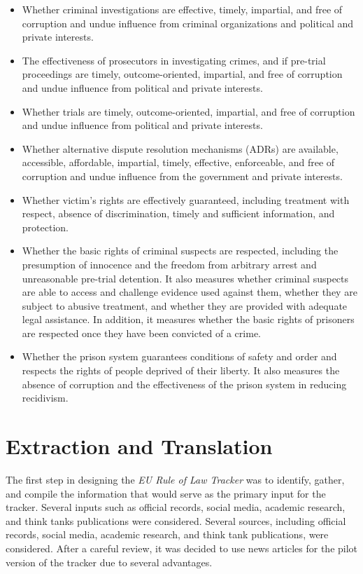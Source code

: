 \documentclass[
]{agujournal2019}
\providecommand{\tightlist}{%
  \setlength{\itemsep}{0pt}\setlength{\parskip}{0pt}}\usepackage{longtable,booktabs,array}
\begin{document}
\begin{itemize}
\tightlist
\item
  Whether criminal investigations are effective, timely, impartial, and
  free of corruption and undue influence from criminal organizations and
  political and private interests.
\item
  The effectiveness of prosecutors in investigating crimes, and if
  pre-trial proceedings are timely, outcome-oriented, impartial, and
  free of corruption and undue influence from political and private
  interests.
\item
  Whether trials are timely, outcome-oriented, impartial, and free of
  corruption and undue influence from political and private interests.
\item
  Whether alternative dispute resolution mechanisms (ADRs) are
  available, accessible, affordable, impartial, timely, effective,
  enforceable, and free of corruption and undue influence from the
  government and private interests.
\item
  Whether victim's rights are effectively guaranteed, including
  treatment with respect, absence of discrimination, timely and
  sufficient information, and protection.
\item
  Whether the basic rights of criminal suspects are respected, including
  the presumption of innocence and the freedom from arbitrary arrest and
  unreasonable pre-trial detention. It also measures whether criminal
  suspects are able to access and challenge evidence used against them,
  whether they are subject to abusive treatment, and whether they are
  provided with adequate legal assistance. In addition, it measures
  whether the basic rights of prisoners are respected once they have
  been convicted of a crime.
\item
  Whether the prison system guarantees conditions of safety and order
  and respects the rights of people deprived of their liberty. It also
  measures the absence of corruption and the effectiveness of the prison
  system in reducing recidivism.
\end{itemize}

\section{Extraction and Translation}\label{extraction-and-translation}

The first step in designing the \emph{EU Rule of Law Tracker} was to
identify, gather, and compile the information that would serve as the
primary input for the tracker. Several inputs such as official records,
social media, academic research, and think tanks publications were
considered. Several sources, including official records, social media,
academic research, and think tank publications, were considered. After a
careful review, it was decided to use news articles for the pilot
version of the tracker due to several advantages.
\end{document}
